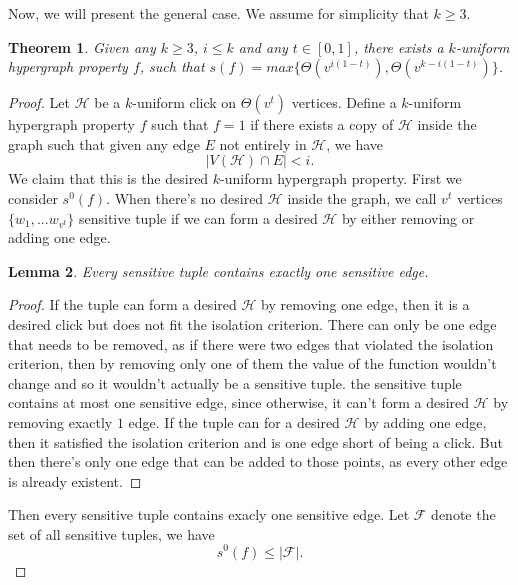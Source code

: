 \documentclass[psamsfonts]{amsart}
\newtheorem{theorem}{Theorem}[section]
\newtheorem{lem}[theorem]{Lemma}
\theoremstyle{definition}
\theoremstyle{remark}
\numberwithin{equation}{section}
\begin{document}
Now, we will present the general case. We assume for simplicity that $k\geq 3$.
	
	\begin{theorem}
		Given any $k\geq 3$, $i \leq k$ and any $t \in [0,1]$, there exists a $k$-uniform hypergraph property $f$, such that $s(f) = max\{\Theta(v^{i(1-t)}), \Theta(v^{k-i(1-t)})\}$.
	\end{theorem}
	\begin{proof}
		Let $\mathcal{H}$ be a $k$-uniform click on $\Theta(v^t)$ vertices.  Define a $k$-uniform hypergraph property $f$ such that $f=1$ if there exists a copy of $\mathcal{H}$ inside the graph such that given any edge $E$ not entirely in $\mathcal{H}$, we have
		\begin{equation}
			|V(\mathcal{H}) \cap E| < i. \nonumber
		\end{equation}
		\indent We claim that this is the desired $k$-uniform hypergraph property. First we consider $s^0(f)$. When there's no desired $\mathcal{H}$ inside the graph, we call $v^t$ vertices $\{w_1,...w_{v^t}\}$ sensitive tuple if we can form a desired $\mathcal{H}$ by either removing or adding one edge. 
		\begin{lem}
			Every sensitive tuple contains exactly one sensitive edge.
		\end{lem}
		\begin{proof}
			If the tuple can form a desired $\mathcal{H}$ by removing one edge, then it is a desired click but does not fit the isolation criterion. There can only be one edge that needs to be removed, as if there were two edges that violated the isolation criterion, then by removing only one of them the value of the function wouldn't change and so it wouldn't actually be a sensitive tuple.
the sensitive tuple contains at most one sensitive edge, since otherwise, it can't form a desired $\mathcal{H}$ by removing exactly $1$ edge. If the tuple can for a desired $\mathcal{H}$ by adding one edge, then it satisfied the isolation criterion and is one edge short of being a click. But then there's only one edge that can be added to those points, as every other edge is already existent.
		\end{proof}
		 Then every sensitive tuple contains exacly one sensitive edge. Let $\mathcal{F}$ denote the set of all sensitive tuples, we have
		\begin{equation}
			s^0(f) \leq |\mathcal{F}|. \nonumber
		\end{equation}

\end{proof}
\end{document}
